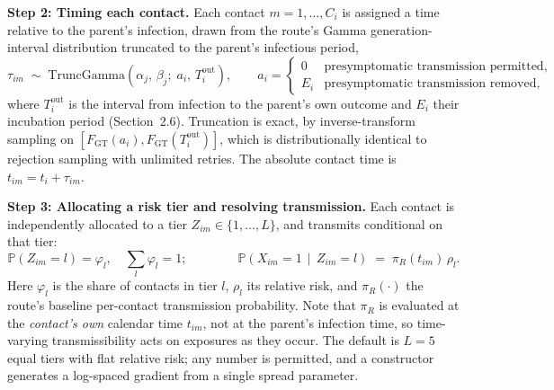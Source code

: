 \documentclass[9pt,letterpaper]{extarticle}
\newcommand{\TG}{\mathrm{TruncGamma}}
\newcommand{\Prob}{\mathbb{P}}
\begin{document}
\textbf{Step 2: Timing each contact.} Each contact $m = 1,\dots,C_i$ is assigned a time relative to the parent's infection, drawn from the route's Gamma generation-interval distribution truncated to the parent's infectious period,
\begin{equation}
\tau_{im} \;\sim\; \TG\!\left(\alpha_j,\, \beta_j;\; a_i,\, T_i^{\mathrm{out}}\right),
\qquad
a_i =
\begin{cases}
0 & \text{presymptomatic transmission permitted,}\\
E_i & \text{presymptomatic transmission removed,}
\end{cases}
\end{equation}
where $T_i^{\mathrm{out}}$ is the interval from infection to the parent's own outcome and $E_i$ their incubation period (Section~2.6). Truncation is exact, by inverse-transform sampling on $[F_{\mathrm{GT}}(a_i), F_{\mathrm{GT}}(T_i^{\mathrm{out}})]$, which is distributionally identical to rejection sampling with unlimited retries. The absolute contact time is $t_{im} = t_i + \tau_{im}$.

\textbf{Step 3: Allocating a risk tier and resolving transmission.} Each contact is independently allocated to a tier $Z_{im} \in \{1,\dots,L\}$, and transmits conditional on that tier:
\begin{equation}
\Prob(Z_{im} = l) = \varphi_l, \quad \textstyle\sum_{l} \varphi_l = 1;
\qquad\qquad
\Prob\!\left(X_{im} = 1 \,\middle|\, Z_{im} = l\right) \;=\; \pi_R(t_{im})\,\rho_l .
\end{equation}
Here $\varphi_l$ is the share of contacts in tier $l$, $\rho_l$ its relative risk, and $\pi_R(\cdot)$ the route's baseline per-contact transmission probability. Note that $\pi_R$ is evaluated at the \emph{contact's own} calendar time $t_{im}$, not at the parent's infection time, so time-varying transmissibility acts on exposures as they occur. The default is $L = 5$ equal tiers with flat relative risk; any number is permitted, and a constructor generates a log-spaced gradient from a single spread parameter.
\end{document}
